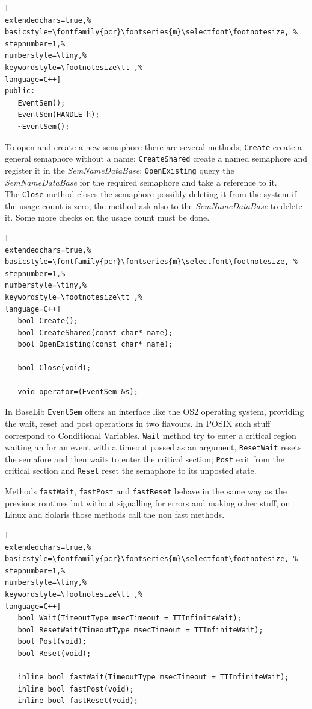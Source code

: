\begin{lstlisting}[
extendedchars=true,%
basicstyle=\fontfamily{pcr}\fontseries{m}\selectfont\footnotesize, %
stepnumber=1,%
numberstyle=\tiny,%
keywordstyle=\footnotesize\tt ,%
language=C++]
public:
   EventSem();
   EventSem(HANDLE h);
   ~EventSem();
\end{lstlisting}

To open and create a new semaphore there are several methods; \texttt{Create} create a general semaphore without a name; \texttt{CreateShared} create a named semaphore and register it in the \textit{SemNameDataBase}; \texttt{OpenExisting} query the \textit{SemNameDataBase} for the required semaphore and take a reference to it. \\


The \texttt{Close} method closes the semaphore possibly deleting it from the system if the usage count is zero; the method ask also to the \textit{SemNameDataBase} to delete it. Some more checks on the usage count must be done.

\begin{lstlisting}[
extendedchars=true,%
basicstyle=\fontfamily{pcr}\fontseries{m}\selectfont\footnotesize, %
stepnumber=1,%
numberstyle=\tiny,%
keywordstyle=\footnotesize\tt ,%
language=C++]
   bool Create();
   bool CreateShared(const char* name);
   bool OpenExisting(const char* name);

   bool Close(void);

   void operator=(EventSem &s);
\end{lstlisting}

In BaseLib \texttt{EventSem} offers an interface like the OS2 operating system, providing the wait, reset and post operations in two flavours. In POSIX such stuff correspond to Conditional Variables. \texttt{Wait} method try to enter a critical region waiting an for an event with a timeout passed as an argument, \texttt{ResetWait} resets the semafore and then waits to enter the critical section; \texttt{Post} exit from the critical section and \texttt{Reset} reset the semaphore to its unposted state.

Methods \texttt{fastWait}, \texttt{fastPost} and \texttt{fastReset} behave in the same way as the previous routines but without signalling for errors and making other stuff, on Linux and Solaris those methods call the non fast methods.

\begin{lstlisting}[
extendedchars=true,%
basicstyle=\fontfamily{pcr}\fontseries{m}\selectfont\footnotesize, %
stepnumber=1,%
numberstyle=\tiny,%
keywordstyle=\footnotesize\tt ,%
language=C++]
   bool Wait(TimeoutType msecTimeout = TTInfiniteWait);
   bool ResetWait(TimeoutType msecTimeout = TTInfiniteWait);
   bool Post(void);
   bool Reset(void);

   inline bool fastWait(TimeoutType msecTimeout = TTInfiniteWait);
   inline bool fastPost(void);
   inline bool fastReset(void);
\end{lstlisting}



